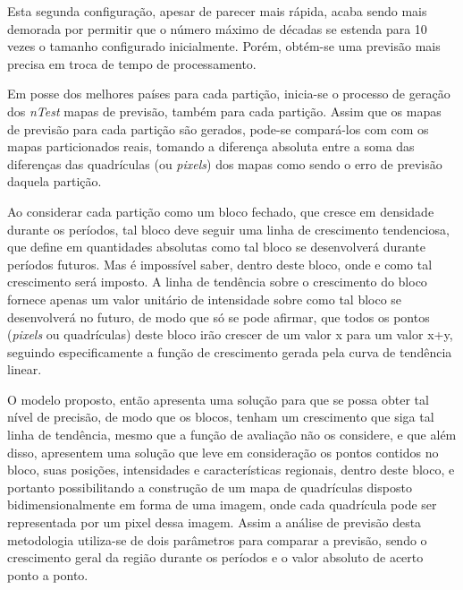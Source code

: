 Esta segunda configuração, apesar de parecer mais rápida, acaba sendo mais demorada por permitir que o número máximo de décadas se estenda para 10 vezes o tamanho configurado inicialmente. Porém, obtém-se uma previsão mais precisa em troca de tempo de processamento.

Em posse dos melhores países para cada partição, inicia-se o processo de geração dos \emph{nTest} mapas de previsão, também para cada partição. Assim que os mapas de previsão para cada partição são gerados, pode-se compará-los com com os mapas particionados reais, tomando a diferença absoluta entre a soma das diferenças das quadrículas (ou \emph{pixels}) dos mapas como sendo o erro de previsão daquela partição. 

Ao considerar cada partição como um bloco fechado, que cresce em densidade durante os períodos, tal bloco deve seguir uma linha de crescimento tendenciosa, que define em quantidades absolutas como tal bloco se desenvolverá durante períodos futuros. Mas é impossível saber, dentro deste bloco, onde e como tal crescimento será imposto. A linha de tendência sobre o crescimento do bloco fornece apenas um valor unitário de intensidade sobre como tal bloco se desenvolverá no futuro, de modo que só se pode afirmar, que todos os pontos (\emph{pixels} ou quadrículas) deste bloco irão crescer de um valor x para um valor x+y, seguindo especificamente a função de crescimento gerada pela curva de tendência linear. 

O modelo proposto, então apresenta uma solução para que se possa obter tal nível de precisão, de modo que os blocos, tenham um crescimento que siga tal linha de tendência, mesmo que a função de avaliação não os considere, e que além disso, apresentem uma solução que leve em consideração os pontos contidos no bloco, suas posições, intensidades e características regionais, dentro deste bloco, e portanto possibilitando a construção de um mapa de quadrículas disposto bidimensionalmente em forma de uma imagem, onde cada quadrícula pode ser representada por um pixel dessa imagem. Assim a análise de previsão desta metodologia utiliza-se de dois parâmetros para comparar a previsão, sendo o crescimento geral da região durante os períodos e o valor absoluto de acerto ponto a ponto.

